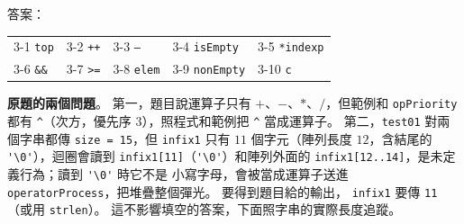 \begin{pastsoln}
答案：
\begin{center}
\begin{tabular}{*{5}{l}}
\toprule
3-1 \texttt{top} & 3-2 \texttt{++} & 3-3 \texttt{--} & 3-4 \texttt{isEmpty} & 3-5 \texttt{*indexp} \\
3-6 \texttt{\&\&} & 3-7 \texttt{>=} & 3-8 \texttt{elem} & 3-9 \texttt{nonEmpty} & 3-10 \texttt{c} \\
\bottomrule
\end{tabular}
\end{center}

\textbf{原題的兩個問題}。 第一，題目說運算子只有 $+$、$-$、$*$、$/$，但範例和 \texttt{opPriority} 都有
\verb|^|（次方，優先序 $3$），照程式和範例把 \verb|^| 當成運算子。 第二，\texttt{test01} 對兩個字串都傳
\texttt{size = 15}，但 \texttt{infix1} 只有 $11$ 個字元（陣列長度 $12$，含結尾的 \verb|'\0'|），迴圈會讀到
\verb|infix1[11]|（\verb|'\0'|）和陣列外面的 \verb|infix1[12..14]|，是未定義行為；讀到 \verb|'\0'| 時它不是
小寫字母，會被當成運算子送進 \texttt{operatorProcess}，把堆疊整個彈光。 要得到題目給的輸出，
\texttt{infix1} 要傳 \texttt{11}（或用 \texttt{strlen}）。 這不影響填空的答案，下面照字串的實際長度追蹤。


\end{pastsoln}
